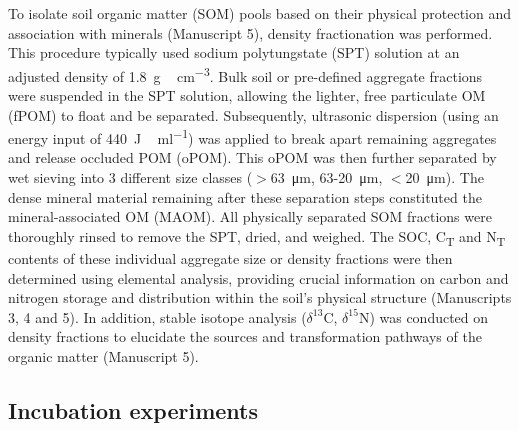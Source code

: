 To isolate soil organic matter (SOM) pools based on their physical protection and association with minerals (Manuscript 5), density fractionation was performed. This procedure typically used sodium polytungstate (SPT) solution at an adjusted density of \SI{1.8}{\gram\,\centi\metre^{-3}}. Bulk soil or pre-defined aggregate fractions were suspended in the SPT solution, allowing the lighter, free particulate OM (fPOM) to float and be separated. Subsequently, ultrasonic dispersion (using an energy input of \SI{440}{\joule\,\milli\litre^{-1}}) was applied to break apart remaining aggregates and release occluded POM (oPOM). This oPOM was then further separated by wet sieving into 3 different size classes ($>$\SI{63}{\micro\metre}, 63-\SI{20}{\micro\metre}, $<$\SI{20}{\micro\metre}). The dense mineral material remaining after these separation steps constituted the mineral-associated OM (MAOM). All physically separated SOM fractions were thoroughly rinsed to remove the SPT, dried, and weighed. The SOC, C\textsubscript{T} and N\textsubscript{T} contents of these individual aggregate size or density fractions were then determined using elemental analysis, providing crucial information on carbon and nitrogen storage and distribution within the soil's physical structure (Manuscripts 3, 4 and 5). In addition, stable isotope analysis ($\delta^{13}\mathrm{C}$, $\delta^{15}\mathrm{N}$) was conducted on density fractions to elucidate the sources and transformation pathways of the organic matter (Manuscript 5).

\subsection{Incubation experiments}

